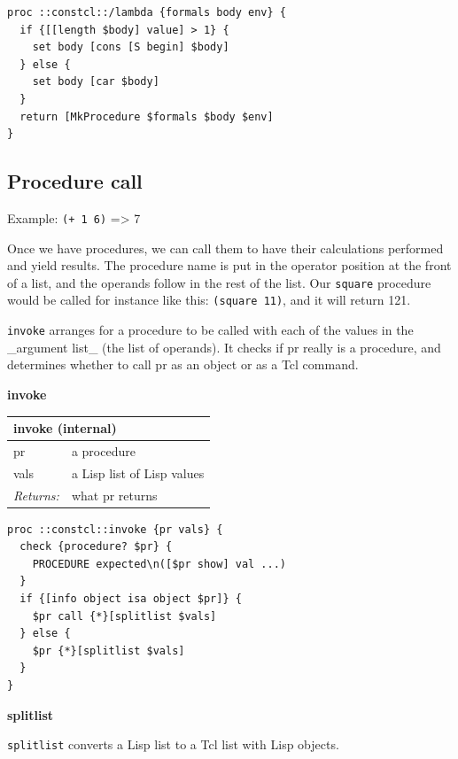 \documentclass[twoside,9pt]{report}
\begin{document}
\noindent\makebox[\linewidth]{\rule{\linewidth}{0.4pt}}
\begin{lstlisting}
proc ::constcl::/lambda {formals body env} {
  if {[[length $body] value] > 1} {
    set body [cons [S begin] $body]
  } else {
    set body [car $body]
  }
  return [MkProcedure $formals $body $env]
}
\end{lstlisting}
\noindent\makebox[\linewidth]{\rule{\linewidth}{0.4pt}}
\subsection{Procedure call}
\label{procedure-call}

Example: \texttt{(+ 1 6)} => 7


Once we have procedures, we can call them to have their calculations performed and yield results. The procedure name is put in the operator position at the front of a list, and the operands follow in the rest of the list. Our \texttt{square} procedure would be called for instance like this: \texttt{(square 11)}, and it will return 121.


\texttt{invoke} arranges for a procedure to be called with each of the values in the \_argument list\_ (the list of operands). It checks if pr really is a procedure, and determines whether to call pr as an object or as a Tcl command.


\textbf{invoke}

\begin{tabular}{ |l l| }
\hline
\multicolumn{2}{|l|}{invoke (internal)} \\
\hline
pr & a procedure \\
vals & a Lisp list of Lisp values \\
\textit{Returns:} & what pr returns \\
\hline
\end{tabular}

\noindent\makebox[\linewidth]{\rule{\linewidth}{0.4pt}}
\begin{lstlisting}
proc ::constcl::invoke {pr vals} {
  check {procedure? $pr} {
    PROCEDURE expected\n([$pr show] val ...)
  }
  if {[info object isa object $pr]} {
    $pr call {*}[splitlist $vals]
  } else {
    $pr {*}[splitlist $vals]
  }
}
\end{lstlisting}
\noindent\makebox[\linewidth]{\rule{\linewidth}{0.4pt}}

\textbf{splitlist}


\texttt{splitlist} converts a Lisp list to a Tcl list with Lisp objects.
\end{document}
